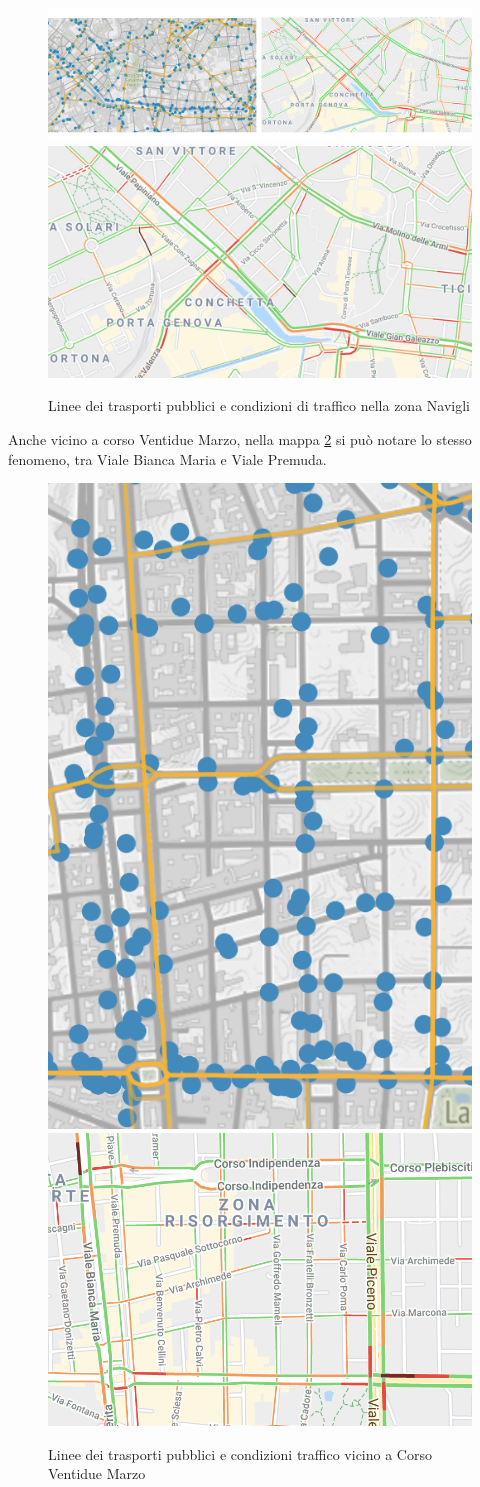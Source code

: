 \documentclass[a4paper]{report}
\begin{document}
\begin{figure}
    \includegraphics[width=0.51\linewidth]{../src/atm/navigli.png}
    \includegraphics[width=0.49\linewidth]{../src/codice_per_dati/googleMaps/navigli.png}
    \caption{Linee dei trasporti pubblici e condizioni di traffico nella zona Navigli}
    \label{fig:navigli}
\end{figure}

Anche vicino a corso Ventidue Marzo, nella mappa \ref{fig:22-marzo} si può 
notare lo stesso fenomeno, tra Viale Bianca Maria e Viale Premuda.

\begin{figure}
    \includegraphics[width=0.25\linewidth]{../src/atm/22_marzo.png}
    \includegraphics[width=0.55\linewidth]{../src/codice_per_dati/googleMaps/22_marzo.png}
    \caption{Linee dei trasporti pubblici e condizioni traffico vicino a Corso Ventidue Marzo}
    \label{fig:22-marzo}
\end{figure}
\end{document}

